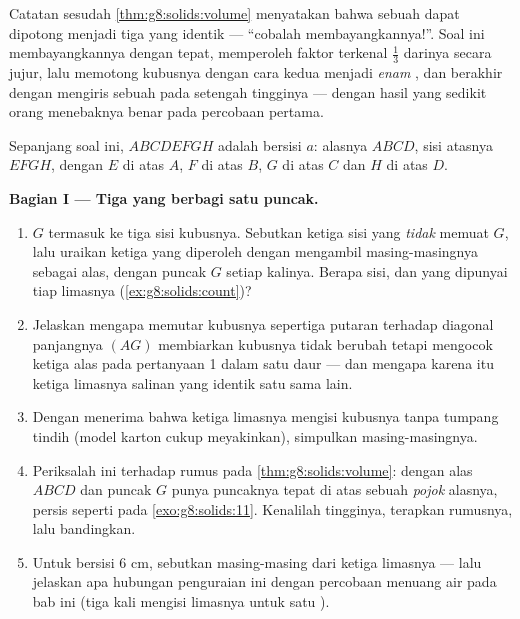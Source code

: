 \begin{problem}
\label{pb:g8:solids:1}
Catatan sesudah \cref{thm:g8:solids:volume} menyatakan bahwa sebuah
 dapat dipotong menjadi tiga  yang identik --- ``cobalah
membayangkannya!''. Soal ini membayangkannya dengan tepat, memperoleh
faktor terkenal $\frac13$ darinya secara jujur, lalu memotong kubusnya
dengan cara kedua menjadi \emph{enam} , dan berakhir dengan
mengiris sebuah  pada setengah tingginya --- dengan hasil yang
sedikit orang menebaknya benar pada percobaan pertama.

Sepanjang soal ini, $ABCDEFGH$ adalah  bersisi $a$: alasnya
$ABCD$, sisi atasnya $EFGH$, dengan $E$ di atas $A$, $F$ di atas $B$,
$G$ di atas $C$ dan $H$ di atas $D$.

\medskip
\noindent\textbf{Bagian I --- Tiga  yang berbagi satu puncak.}
\begin{enumerate}
  \item {} $G$ termasuk ke tiga sisi kubusnya. Sebutkan
        ketiga sisi yang \emph{tidak} memuat $G$, lalu
        uraikan ketiga  yang diperoleh dengan mengambil
        masing-masingnya sebagai alas, dengan puncak $G$ setiap
        kalinya. Berapa sisi,  dan  yang dipunyai
        tiap limasnya (\cref{ex:g8:solids:count})?
  \item Jelaskan mengapa memutar kubusnya sepertiga putaran terhadap
        diagonal panjangnya $(AG)$ membiarkan kubusnya tidak berubah
        tetapi mengocok ketiga alas pada pertanyaan 1 dalam satu
        daur --- dan mengapa karena itu ketiga limasnya salinan
        yang identik satu sama lain.
  \item Dengan menerima bahwa ketiga limasnya mengisi kubusnya tanpa
        tumpang tindih (model karton cukup meyakinkan),
        simpulkan  masing-masingnya.
  \item Periksalah ini terhadap rumus pada
        \cref{thm:g8:solids:volume}:  dengan alas $ABCD$
        dan puncak $G$ punya puncaknya tepat di atas sebuah
        \emph{pojok} alasnya, persis seperti pada
        \cref{exo:g8:solids:11}. Kenalilah tingginya, terapkan
        rumusnya, lalu bandingkan.
  \item Untuk  bersisi $6$ cm, sebutkan  masing-masing
        dari ketiga limasnya --- lalu jelaskan apa hubungan
        penguraian ini dengan percobaan menuang air pada bab ini
        (tiga kali mengisi limasnya untuk satu ).
\end{enumerate}


\end{problem}
